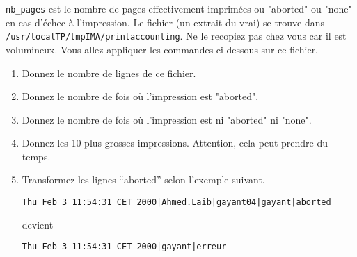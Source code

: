 \documentclass[a4paper]{article}
\begin{document}
\texttt{nb\_pages} est le nombre de pages effectivement imprimées ou
"aborted" ou "none" en cas d'échec à l'impression. Le fichier (un
extrait du vrai) se trouve dans
\texttt{/usr/localTP/tmpIMA/printaccounting}.  Ne le recopiez pas chez
vous car il est volumineux. Vous allez appliquer les commandes
ci-dessous sur ce fichier.

\begin{enumerate}
\item Donnez le nombre de lignes de ce fichier.


\item Donnez le nombre de fois où l'impression est "aborted".


\item Donnez le nombre de fois où l'impression est ni "aborted"
  ni "none".


\item Donnez les 10 plus grosses impressions. Attention, cela peut prendre du temps.


\item Transformez les lignes ``aborted'' selon l'exemple suivant.

\smallskip
  
\texttt{Thu Feb 3 11:54:31 CET 2000|Ahmed.Laib|gayant04|gayant|aborted}

\smallskip

devient

\smallskip

\texttt{Thu Feb 3 11:54:31 CET 2000|gayant|erreur}

\end{enumerate}
\end{document}
